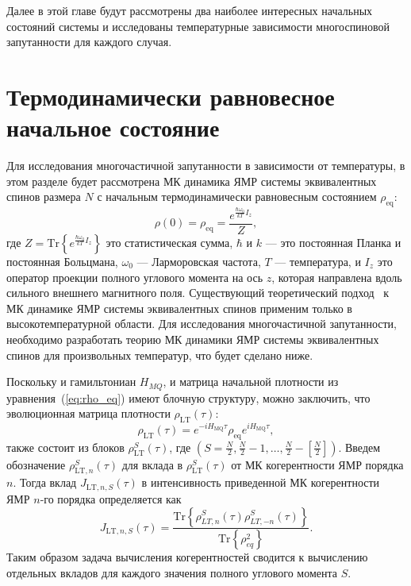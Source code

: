 Далее в этой главе будут рассмотрены два наиболее интересных начальных состояний системы
и исследованы температурные зависимости многоспиновой запутанности для каждого случая.

\section{Термодинамически равновесное начальное состояние}
\label{sec:nanopora-thermodynamic-equilibrium}

Для исследования многочастичной запутанности в зависимости от температуры,
в этом разделе будет рассмотрена МК динамика ЯМР
системы эквивалентных спинов размера $N$
с начальным термодинамически равновесным состоянием $\rho_\mathrm{eq}$:
%
\begin{equation}\label{eq:rho_eq}
  \rho(0) = \rho_{\mathrm{eq}} = \dfrac{e^{\frac{\hbar\omega_{0}}{kT} I_z}}{Z},
\end{equation}
%
где $Z =\mathrm{Tr}\left\{e^{\frac{\hbar\omega_{0}}{kT} I_z}\right\}$ это статистическая сумма,
$\hbar$ и $k$ --- это постоянная Планка и постоянная Больцмана,
$\omega_0$ --- Ларморовская частота,
$T$ --- температура,
и $I_z$ это оператор проекции полного углового момента на ось $z$,
которая направлена вдоль сильного внешнего магнитного поля.
%
Существующий теоретический подход~\cite{Doronin2009, Doronin2011}
к МК динамике ЯМР системы эквивалентных спинов
применим только в высокотемпературной области.
Для исследования многочастичной запутанности,
необходимо разработать теорию МК динамики ЯМР системы эквивалентных спинов
для произвольных температур,
что будет сделано ниже.

Поскольку и гамильтониан $H_{MQ}$, и матрица начальной плотности из уравнения~(\ref{eq:rho_eq}) имеют блочную структуру,
можно заключить,
что эволюционная матрица плотности $\rho_\mathrm{LT}(\tau)$:
%
\begin{equation}
  \label{eq:rho_eval_lt}
  \rho_\mathrm{LT} (\tau) = e^{-iH_\mathrm{MQ}\tau} \rho_\mathrm{eq} e^{iH_\mathrm{MQ}\tau},
\end{equation}
%
также состоит из блоков $\rho^S_\mathrm{LT}(\tau)$,
где $(S=\frac N 2, \frac N 2 - 1, \dots, \frac N 2 - \left[\frac N 2\right])$.
Введем обозначение $\rho^S_{\mathrm{LT}, n}(\tau)$ для
вклада в $\rho^S_\mathrm{LT}(\tau)$ от МК когерентности ЯМР порядка $n$.
Тогда вклад $J_{\mathrm{LT}, n, S}(\tau)$ в интенсивность приведенной МК когерентности ЯМР $n$-го порядка определяется как
%
\begin{equation}
    \label{eq:coherence_k_s}
    J_{\mathrm{LT}, n, S}(\tau) = \dfrac{\mathrm{Tr}\left\{
        \rho_{LT, n}^S(\tau)\rho_{LT, -n}^S(\tau)
    \right\}}
    {\mathrm{Tr}\left\{\rho^2_{eq}\right\}}.
\end{equation}
%
Таким образом задача вычисления когерентностей сводится к вычислению отдельных вкладов для каждого значения полного углового момента $S$.

